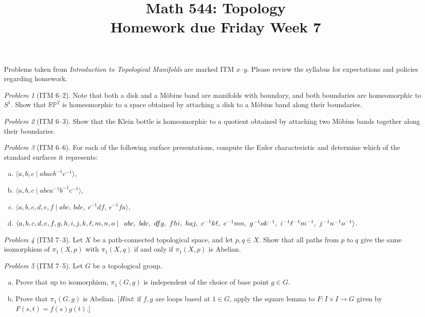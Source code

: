 \documentclass[11pt,twoside]{amsart}
\title{Math 544: Topology\\ Homework due Friday Week 7}
\theoremstyle{plain}
\theoremstyle{remark}
\newtheorem{prob}{Problem}
\theoremstyle{definition}
\theoremstyle{definition}
\newcommand{\RR}{\mathbb{R}}
\newcommand{\PP}{\mathbb{P}}
\begin{document}
\maketitle

\noindent Problems taken from \emph{Introduction to Topological Manifolds} are marked ITM $x$--$y$. Please review the syllabus for expectations and policies regarding homework.

\begin{prob}[ITM 6--2]
Note that both a disk and a M\"obius band are manifolds with boundary, and both boundaries are homeomorphic to $S^1$. Show that $\RR\PP^2$ is homeomorphic to a space obtained by attaching a disk to a M\"obius band along their boundaries.
\end{prob}

\begin{prob}[ITM 6--3]
Show that the Klein bottle is homeomorphic to a quotient obtained by attaching two M\"obius bands together along their boundaries.
\end{prob}

\begin{prob}[ITM 6--6]
For each of the following surface presentations, compute the Euler characteristic and determine which of the standard surfaces it represents:
\begin{enumerate}[(a)]
\item $\langle a,b,c\mid abacb^{-1}c^{-1}\rangle$,
\item $\langle a,b,c\mid abca^{-1}b^{-1}c^{-1}\rangle$,
\item $\langle a,b,c,d,e,f\mid abc,~bde,~c^{-1}df,~e^{-1}fa\rangle$,
\item $\langle a,b,c,d,e,f,g,h,i,j,k,\ell,m,n,o\mid \\ \phantom{a}abc,~bde,~dfg,~fhi,~haj,~c^{-1}k\ell,~e^{-1}mn,~g^{-1}ok^{-1},~i^{-1}\ell^{-1}m^{-1},~j^{-1}n^{-1}o^{-1}\rangle$.
\end{enumerate}
\end{prob}

\begin{prob}[ITM 7--3]
Let $X$ be a path-connected topological space, and let $p,q\in X$. Show that all paths from $p$ to $q$ give the same isomorphism of $\pi_1(X,p)$ with $\pi_1(X,q)$ if and only if $\pi_1(X,p)$ is Abelian.
\end{prob}

\begin{prob}[ITM 7--5]
Let $G$ be a topological group.
\begin{enumerate}[(a)]
\item Prove that up to isomorphism, $\pi_1(G,g)$ is independent of the choice of base point $g\in G$.
\item Prove that $\pi_1(G,g)$ is Abelian. [\emph{Hint}: if $f,g$ are loops based at $1\in G$, apply the square lemma to $F\colon I\times I\to G$ given by $F(s,t) = f(s)g(t)$.]
\end{enumerate}
\end{prob}
\end{document}
